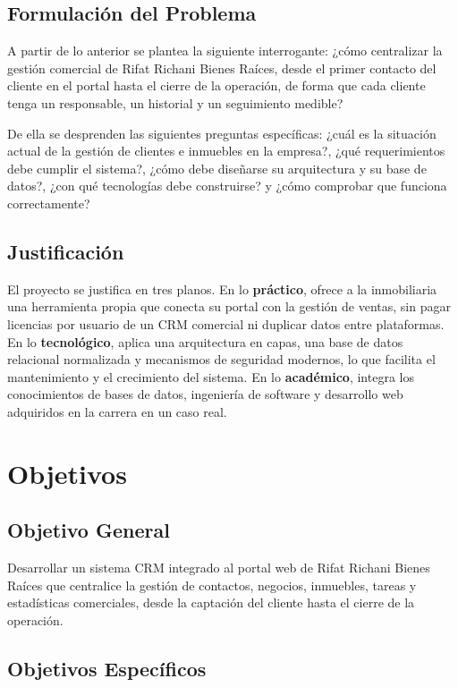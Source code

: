 \documentclass[stu,12pt,letterpaper,donotrepeattitle,floatsintext]{apa7}
\begin{document}
\subsection{Formulación del Problema}

A partir de lo anterior se plantea la siguiente interrogante: ¿cómo centralizar la gestión comercial de Rifat Richani Bienes Raíces, desde el primer contacto del cliente en el portal hasta el cierre de la operación, de forma que cada cliente tenga un responsable, un historial y un seguimiento medible?

De ella se desprenden las siguientes preguntas específicas: ¿cuál es la situación actual de la gestión de clientes e inmuebles en la empresa?, ¿qué requerimientos debe cumplir el sistema?, ¿cómo debe diseñarse su arquitectura y su base de datos?, ¿con qué tecnologías debe construirse? y ¿cómo comprobar que funciona correctamente?

\subsection{Justificación}

El proyecto se justifica en tres planos. En lo \textbf{práctico}, ofrece a la inmobiliaria una herramienta propia que conecta su portal con la gestión de ventas, sin pagar licencias por usuario de un CRM comercial ni duplicar datos entre plataformas. En lo \textbf{tecnológico}, aplica una arquitectura en capas, una base de datos relacional normalizada y mecanismos de seguridad modernos, lo que facilita el mantenimiento y el crecimiento del sistema. En lo \textbf{académico}, integra los conocimientos de bases de datos, ingeniería de software y desarrollo web adquiridos en la carrera en un caso real.

\section{Objetivos}

\subsection{Objetivo General}

Desarrollar un sistema CRM integrado al portal web de Rifat Richani Bienes Raíces que centralice la gestión de contactos, negocios, inmuebles, tareas y estadísticas comerciales, desde la captación del cliente hasta el cierre de la operación.

\subsection{Objetivos Específicos}
\end{document}
